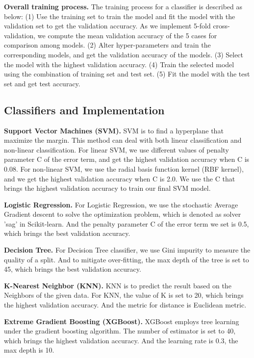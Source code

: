 \documentclass{article}
\begin{document}
\textbf{Overall training process.}
The training process for a classifier is described as below: (1) Use the training set to train the model and fit the model with the validation set to get the validation accuracy. As we implement 5-fold cross-validation, we compute the mean validation accuracy of the 5 cases for comparison among models. (2) Alter hyper-parameters and train the corresponding models, and get the validation accuracy of the models. (3) Select the model with the highest validation accuracy. (4) Train the selected model using the combination of training set and test set. (5) Fit the model with the test set and get test accuracy.

\subsection{Classifiers and Implementation}
\textbf{Support Vector Machines (SVM).}
SVM is to find a hyperplane that maximize the margin. This method can deal with both linear classification and non-linear classification. For linear SVM, we use different values of penalty parameter C of the error term, and get the highest validation accuracy when C is 0.08. For non-linear SVM, we use the radial basis function kernel (RBF kernel), and we get the highest validation accuracy when C is 2.0. We use the C that brings the highest validation accuracy to train our final SVM model.

\textbf{Logistic Regression.}
For Logistic Regression, we use the stochastic Average Gradient descent to solve the optimization problem, which is denoted as solver 'sag' in Scikit-learn. And the penalty parameter C of the error term we set is 0.5, which brings the best validation accuracy.

\textbf{Decision Tree.}
For Decision Tree classifier, we use Gini impurity to measure the quality of a split. And to mitigate over-fitting, the max depth of the tree is set to 45, which brings the best validation accuracy.

\textbf{K-Nearest Neighbor (KNN).}
KNN is to predict the result based on the Neighbors of the given data. For KNN, the value of K is set to 20, which brings the highest validation accuracy. And the metric for distance is Euclidean metric.

\textbf{Extreme Gradient Boosting (XGBoost).}
XGBoost employs tree learning under the gradient boosting algorithm. The number of estimator is set to 40, which brings the highest validation accuracy. And the learning rate is 0.3, the max depth is 10.
\end{document}
